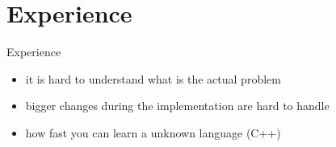 \section{Experience}
\begin{frame}{Experience}
	\begin{itemize}
		\item it is hard to understand what is the actual problem
		\item bigger changes during the implementation are hard to handle
		\item how fast you can learn a unknown language (C++)
	\end{itemize}
\end{frame}